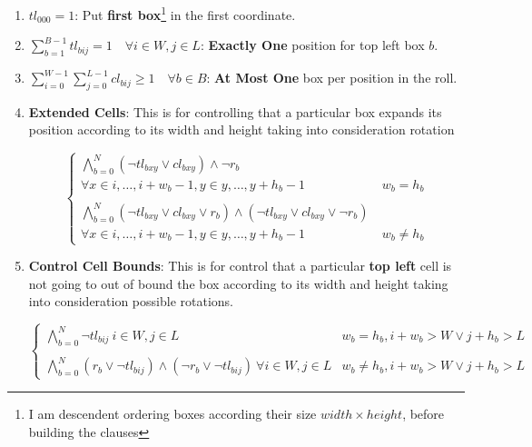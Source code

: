\documentclass[12pt, a4paper]{article}
\begin{document}
\begin{enumerate}
  \item $tl_{000} = 1$: Put \textbf{first box}\footnote{I am descendent ordering boxes according their size $width \times height$, before building the clauses}  in the first coordinate.\label{prop:1}
  \item $\sum_{b=1}^{B-1} tl_{bij} = 1 \quad \forall i \in W, j \in L$: \textbf{Exactly One} position for top left box $b$. \label{prop:2}
  \item $\sum_{i=0}^{W-1} \sum_{j=0}^{L-1} cl_{bij} \geq 1 \quad \forall b \in B$: \textbf{At Most One} box per position in the roll. \label{prop:3}
  \item \textbf{Extended Cells}: This is for controlling that a particular box expands its position according to its width and height taking into consideration rotation \label{prop:4}

   \begin{equation}
    \begin{cases}
      \bigwedge\limits_{b=0}^N (\lnot tl_{bxy} \lor cl_{bxy}) \land \lnot r_b \\
        \forall x \in {i, \dots, i + w_b - 1}, y \in {y, \dots, y + h_b - 1}  & w_b = h_b \\\\
      \bigwedge\limits_{b=0}^N (\lnot tl_{bxy} \lor cl_{bxy} \lor r_b) \land (\lnot tl_{bxy} \lor cl_{bxy} \lor \lnot r_b) \ \\
        \forall x \in {i, \dots, i + w_b - 1}, y \in {y, \dots, y + h_b - 1} & w_b \neq h_b
    \end{cases}
  \end{equation}

\item \textbf{Control Cell Bounds}: This is for control that a particular \textbf{top left} cell is not going to out of bound the box according to its width and height taking into consideration possible rotations.\label{prop:5}

   \begin{equation}
    \begin{cases}
      \bigwedge\limits_{b=0}^N \lnot tl_{bij} \ i \in W, j \in L & w_b = h_b, i+w_b > W \lor j+h_b > L \\\\
      \bigwedge\limits_{b=0}^N (r_b \lor \lnot tl_{bij}) \land (\lnot r_b \lor \lnot tl_{bij}) \ \forall i \in W, j \in L & w_b \neq h_b, i+w_b > W \lor j+h_b > L
    \end{cases}
  \end{equation}

\end{enumerate}
\end{document}

